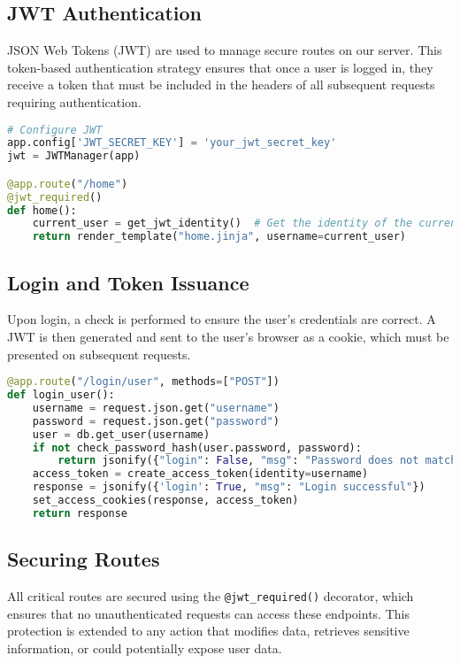\documentclass{article}
\begin{document}
\subsection*{JWT Authentication}
JSON Web Tokens (JWT) are used to manage secure routes on our server. This token-based authentication strategy ensures that once a user is logged in, they receive a token that must be included in the headers of all subsequent requests requiring authentication.

\begin{lstlisting}[language=Python]
# Configure JWT
app.config['JWT_SECRET_KEY'] = 'your_jwt_secret_key'
jwt = JWTManager(app) 

@app.route("/home")
@jwt_required()
def home():
    current_user = get_jwt_identity()  # Get the identity of the current user from JWT
    return render_template("home.jinja", username=current_user)
\end{lstlisting}

\subsection*{Login and Token Issuance}
Upon login, a check is performed to ensure the user's credentials are correct. A JWT is then generated and sent to the user's browser as a cookie, which must be presented on subsequent requests.

\begin{lstlisting}[language=Python]
@app.route("/login/user", methods=["POST"])
def login_user():
    username = request.json.get("username")
    password = request.json.get("password")
    user = db.get_user(username)
    if not check_password_hash(user.password, password):
        return jsonify({"login": False, "msg": "Password does not match!"}), 401
    access_token = create_access_token(identity=username)
    response = jsonify({'login': True, "msg": "Login successful"})
    set_access_cookies(response, access_token)
    return response
\end{lstlisting}

\subsection*{Securing Routes}
All critical routes are secured using the \texttt{@jwt\_required()} decorator, which ensures that no unauthenticated requests can access these endpoints. This protection is extended to any action that modifies data, retrieves sensitive information, or could potentially expose user data.
\end{document}
